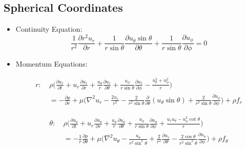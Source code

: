 \documentclass{article}
\begin{document}
    \subsection{Spherical Coordinates}
        \begin{itemize}
            \item Continuity Equation:
            \[\frac{1}{r^{2}}\frac{\partial r^{2}u_{r}}{\partial r} + \frac{1}{r \sin \theta}\frac{\partial u_{\theta}\sin \theta}{\partial \theta} + \frac{1}{r \sin \theta}\frac{\partial u_{\phi}}{\partial \phi}=0\]
            
            \item Momentum Equations:
            
            \begin{equation*}
            \begin{split}
            r: \ & \rho \bigg(\frac{\partial u_{r}}{\partial t} + u_{r} \frac{\partial u_{r}}{\partial r} + \frac{u_{\theta}}{r}\frac{\partial u_{r}}{\partial \theta} + \frac{u_{\phi}}{r \sin \theta} \frac{\partial u_{r}}{\partial \phi} - \frac{u_{\theta}^{2}+u_{\phi}^{2}}{r} \bigg)  \\ 
            & = -\frac{\partial p}{\partial r} + \mu \bigg( \nabla^{2}u_{r} - \frac{2u_{r}}{r^{2}} - \frac{2}{r^{2}\sin \theta}\frac{\partial}{\partial \theta}(u_{\theta}\sin\theta) + \frac{2}{r^{2}\sin\theta}\frac{\partial u_{\phi}}{\partial \phi} \bigg) + \rho f_{r}
            \end{split}  
            \end{equation*}
            
            \begin{equation*}
            \begin{split}
            \theta: \ & \rho \bigg(\frac{\partial u_{\theta}}{\partial t} + u_{r} \frac{\partial u_{\theta}}{\partial r} + \frac{u_{\theta}}{r} \frac{\partial u_{\theta}}{\partial \theta} + \frac{u_{\phi}}{r\sin \theta} \frac{\partial u_{\theta}}{\partial \phi} + \frac{u_{r}u_{\theta}-u_{\phi}^{2}\cot\theta}{r} \bigg) \\
            & = -\frac{1}{r}\frac{\partial p}{\partial \theta} + \mu \bigg( \nabla^{2}u_{\theta} - \frac{u_{\theta}}{r^{2}\sin^{2}\theta} + \frac{2}{r^{2}}\frac{\partial u_{r}}{\partial \theta} - \frac{2\cos \theta}{r^{2}\sin^{2}\theta}\frac{\partial u_{\phi}}{\partial \phi} \bigg) + \rho f_{\theta}
            \end{split}  
            \end{equation*}
            

\end{itemize}
\end{document}
